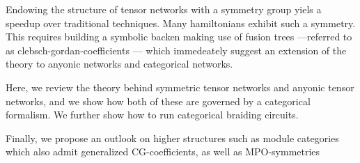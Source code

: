Endowing the structure of tensor networks with a symmetry group
yiels a speedup over traditional techniques. Many hamiltonians
exhibit such a symmetry. This requires building a symbolic backen
making use of fusion trees ---referred to as clebsch-gordan-coefficients --- which immedeately suggest an extension
of the theory to anyonic networks and categorical networks. 

Here, we review the theory behind symmetric tensor networks and
anyonic tensor networks, and we show how both of these are governed
by a categorical formalism. We further show how to run categorical
braiding circuits.

Finally, we propose an outlook on higher structures such as module categories
which also admit generalized CG-coefficients, as well as MPO-symmetries

